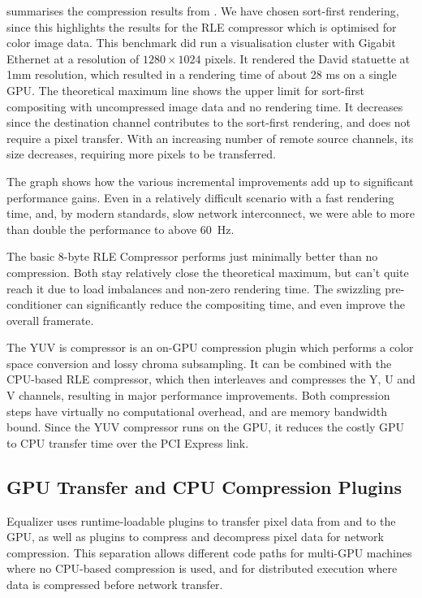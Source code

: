  summarises the compression results from \cite{MEP:10}. We have
chosen sort-first rendering, since this highlights the results for the RLE
compressor which is optimised for color image data. This benchmark did run a
visualisation cluster with Gigabit Ethernet at a resolution of $1280\times
1024$ pixels. It rendered the David statuette at 1mm resolution, which resulted
in a rendering time of about 28 ms on a single GPU. The theoretical maximum
line shows the upper limit for sort-first compositing with uncompressed image
data and no rendering time. It decreases since the destination channel
contributes to the sort-first rendering, and does not require a pixel transfer.
With an increasing number of remote source channels, its size decreases,
requiring more pixels to be transferred.

The graph shows how the various incremental improvements add up to significant
performance gains. Even in a relatively difficult scenario with a fast
rendering time, and, by modern standards, slow network interconnect, we were
able to more than double the performance to above 60~Hz.

The basic 8-byte RLE Compressor performs just minimally better than no
compression. Both stay relatively close the theoretical maximum, but can't
quite reach it due to load imbalances and non-zero rendering time. The
swizzling pre-conditioner can significantly reduce the compositing time, and
even improve the overall framerate.

The YUV is compressor is an on-GPU compression plugin which performs a
color space conversion and lossy chroma subsampling. It can be combined with the
CPU-based RLE compressor, which then interleaves and compresses the Y, U and V
channels, resulting in major performance improvements. Both compression steps
have virtually no computational overhead, and are memory bandwidth bound. Since
the YUV compressor runs on the GPU, it reduces the costly GPU to CPU transfer
time over the PCI Express link.

\subsection{GPU Transfer and CPU Compression Plugins}

Equalizer uses runtime-loadable plugins to transfer pixel data from and to the
GPU, as well as plugins to compress and decompress pixel data for network
compression. This separation allows different code paths for multi-GPU machines
where no CPU-based compression is used, and for distributed execution where data
is compressed before network transfer.

